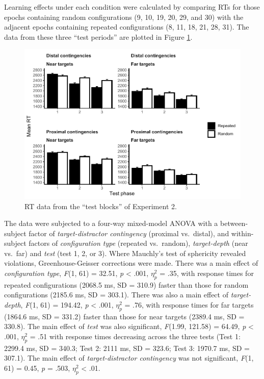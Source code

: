 \documentclass[
  english,
  man,floatsintext]{apa7}
\begin{document}
Learning effects under each condition were calculated by comparing RTs for those epochs containing random configurations (9, 10, 19, 20, 29, and 30) with the adjacent epochs containing repeated configurations (8, 11, 18, 21, 28, 31). The data from these three ``test periods'' are plotted in Figure \ref{fig:Exp2-test-figure}.



\begin{figure}

{\centering \includegraphics[width=1\linewidth]{CCVR_manuscript_files/figure-latex/Exp2-test-figure-1} 

}

\caption{RT data from the ``test blocks'' of Experiment 2.}\label{fig:Exp2-test-figure}
\end{figure}

The data were subjected to a four-way mixed-model ANOVA with a between-subject factor of \emph{target-distractor contingency} (proximal vs.~distal), and within-subject factors of \emph{configuration type} (repeated vs.~random), \emph{target-depth} (near vs.~far) and \emph{test} (test 1, 2, or 3). Where Mauchly's test of sphericity revealed violations, Greenhouse-Geisser corrections were made. There was a main effect of \emph{configuration type}, \emph{F}(1, 61) = 32.51, \emph{p} \textless{} .001, \(\eta^2_p\) = .35, with response times for repeated configurations (2068.5 ms, SD = 310.9) faster than those for random configurations (2185.6 ms, SD = 303.1). There was also a main effect of \emph{target-depth}, \emph{F}(1, 61) = 194.42, \emph{p} \textless{} .001, \(\eta^2_p\) = .76, with response times for far targets (1864.6 ms, SD = 331.2) faster than those for near targets (2389.4 ms, SD = 330.8). The main effect of \emph{test} was also significant, \emph{F}(1.99, 121.58) = 64.49, \emph{p} \textless{} .001, \(\eta^2_p\) = .51 with response times decreasing across the three tests (Test 1: 2299.4 ms, SD = 340.3; Test 2: 2111 ms, SD = 323.6; Test 3: 1970.7 ms, SD = 307.1). The main effect of \emph{target-distractor contingency} was not significant, \emph{F}(1, 61) = 0.45, \emph{p} = .503, \(\eta^2_p\) \textless{} .01.
\end{document}

